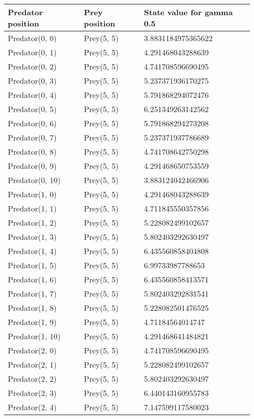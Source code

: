 \begin{longtable}{| p{} | p{} | p{} |} 
   Predator position & Prey position & State value for gamma 0.5 \\
    \hline
Predator(0, 0) & Prey(5, 5) &3.8831184975365622\\
Predator(0, 1) & Prey(5, 5) &4.291468043288639\\
Predator(0, 2) & Prey(5, 5) &4.741708596690495\\
Predator(0, 3) & Prey(5, 5) &5.237371936170275\\
Predator(0, 4) & Prey(5, 5) &5.791868294072476\\
Predator(0, 5) & Prey(5, 5) &6.251349263142562\\
Predator(0, 6) & Prey(5, 5) &5.791868294273208\\
Predator(0, 7) & Prey(5, 5) &5.237371937786689\\
Predator(0, 8) & Prey(5, 5) &4.741708642750298\\
Predator(0, 9) & Prey(5, 5) &4.291468650753559\\
Predator(0, 10) & Prey(5, 5) &3.883124042466906\\
Predator(1, 0) & Prey(5, 5) &4.291468043288639\\
Predator(1, 1) & Prey(5, 5) &4.711845550357856\\
Predator(1, 2) & Prey(5, 5) &5.228082499102657\\
Predator(1, 3) & Prey(5, 5) &5.802403292630497\\
Predator(1, 4) & Prey(5, 5) &6.435560858404808\\
Predator(1, 5) & Prey(5, 5) &6.99733987788653\\
Predator(1, 6) & Prey(5, 5) &6.435560858413571\\
Predator(1, 7) & Prey(5, 5) &5.802403292831541\\
Predator(1, 8) & Prey(5, 5) &5.228082501476525\\
Predator(1, 9) & Prey(5, 5) &4.71184564014747\\
Predator(1, 10) & Prey(5, 5) &4.291468641484821\\
Predator(2, 0) & Prey(5, 5) &4.741708596690495\\
Predator(2, 1) & Prey(5, 5) &5.228082499102657\\
Predator(2, 2) & Prey(5, 5) &5.802403292630497\\
Predator(2, 3) & Prey(5, 5) &6.440143160955783\\
Predator(2, 4) & Prey(5, 5) &7.147599117580023\\

\end{longtable}
